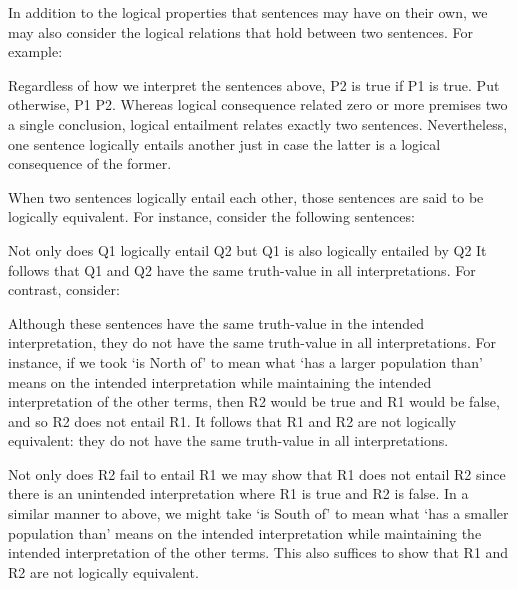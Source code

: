 In addition to the logical properties that sentences may have on their own, we may also consider the logical relations that hold between two sentences.
For example:

\begin{earg}
\end{earg}

Regardless of how we interpret the sentences above, P2 is true if P1 is true.
Put otherwise, P1  P2.
Whereas logical consequence related zero or more premises two a single conclusion, logical entailment relates exactly two sentences.
Nevertheless, one sentence logically entails another just in case the latter is a logical consequence of the former.

When two sentences logically entail each other, those sentences are said to be logically equivalent.
For instance, consider the following sentences:

\begin{earg}
\end{earg}

Not only does Q1 logically entail Q2 but Q1 is also logically entailed by Q2
It follows that Q1 and Q2 have the same truth-value in all interpretations.
For contrast, consider:

\begin{earg}
\end{earg}

Although these sentences have the same truth-value in the intended interpretation, they do not have the same truth-value in all interpretations.
For instance, if we took `is North of' to mean what `has a larger population than' means on the intended interpretation while maintaining the intended interpretation of the other terms, then R2 would be true and R1 would be false, and so R2 does not entail R1.
It follows that R1 and R2 are not logically equivalent: they do not have the same truth-value in all interpretations.

Not only does R2 fail to entail R1 we may show that R1 does not entail R2 since there is an unintended interpretation where R1 is true and R2 is false.
In a similar manner to above, we might take `is South of' to mean what `has a smaller population than' means on the intended interpretation while maintaining the intended interpretation of the other terms.
This also suffices to show that R1 and R2 are not logically equivalent.




